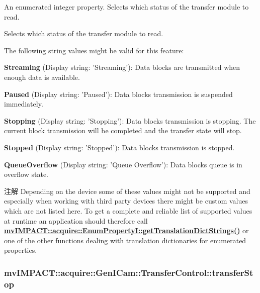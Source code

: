 An enumerated integer property. Selects which status of the transfer module to read. 

Selects which status of the transfer module to read.

The following string values might be valid for this feature\+:
\begin{DoxyItemize}
\item {\bfseries Streaming} (Display string\+: 'Streaming')\+: Data blocks are transmitted when enough data is available.
\item {\bfseries Paused} (Display string\+: 'Paused')\+: Data blocks transmission is suspended immediately.
\item {\bfseries Stopping} (Display string\+: 'Stopping')\+: Data blocks transmission is stopping. The current block transmission will be completed and the transfer state will stop.
\item {\bfseries Stopped} (Display string\+: 'Stopped')\+: Data blocks transmission is stopped.
\item {\bfseries Queue\+Overflow} (Display string\+: 'Queue Overflow')\+: Data blocks queue is in overflow state.
\end{DoxyItemize}

\begin{DoxyNote}{注解}
Depending on the device some of these values might not be supported and especially when working with third party devices there might be custom values which are not listed here. To get a complete and reliable list of supported values at runtime an application should therefore call {\bfseries \hyperlink{classmv_i_m_p_a_c_t_1_1acquire_1_1_enum_property_i_a0ba6ccbf5ee69784d5d0b537924d26b6}{mv\+I\+M\+P\+A\+C\+T\+::acquire\+::\+Enum\+Property\+I\+::get\+Translation\+Dict\+Strings()}} or one of the other functions dealing with translation dictionaries for enumerated properties. 
\end{DoxyNote}
\hypertarget{classmv_i_m_p_a_c_t_1_1acquire_1_1_gen_i_cam_1_1_transfer_control_a3070e07a3a448603af012a8f2eef0bf0}{
\subsubsection[{transfer\+Stop}]{ mv\+I\+M\+P\+A\+C\+T\+::acquire\+::\+Gen\+I\+Cam\+::\+Transfer\+Control\+::transfer\+Stop}}\label{classmv_i_m_p_a_c_t_1_1acquire_1_1_gen_i_cam_1_1_transfer_control_a3070e07a3a448603af012a8f2eef0bf0}


